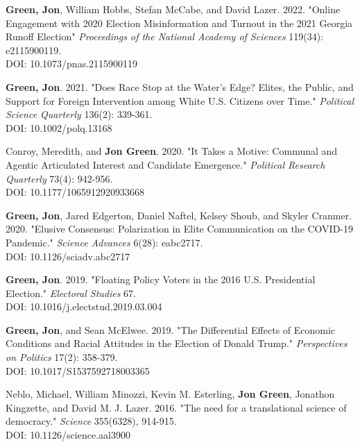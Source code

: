 \documentclass[letterpaper]{article}
\begin{document}
\begin{etaremune}
\item  \textbf{Green, Jon}, William Hobbs, Stefan McCabe, and David Lazer. 2022. "Online Engagement with 2020 Election Misinformation and Turnout in the 2021 Georgia Runoff Election"  \textit{Proceedings of the National Academy of Sciences} 119(34): e2115900119. \\
DOI: 10.1073/pnas.2115900119

\item \textbf{Green, Jon}. 2021. "Does Race Stop at the Water's Edge? Elites, the Public, and Support for Foreign Intervention among White U.S. Citizens over Time." \textit{Political Science Quarterly} 136(2): 339-361. \\
DOI: 10.1002/polq.13168

\item Conroy, Meredith, and \textbf{Jon Green}. 2020. "It Takes a Motive: Communal and Agentic Articulated Interest and Candidate Emergence."  \textit{Political Research Quarterly} 73(4): 942-956. \\
DOI: 10.1177/1065912920933668

\item \textbf{Green, Jon}, Jared Edgerton, Daniel Naftel, Kelsey Shoub, and Skyler Cranmer. 2020. "Elusive Consensus: Polarization in Elite Communication on the COVID-19 Pandemic." \textit{Science Advances} 6(28): eabc2717. \\
DOI: 10.1126/sciadv.abc2717

\item \textbf{Green, Jon}. 2019. "Floating Policy Voters in the 2016 U.S. Presidential Election." \textit{Electoral Studies} 67. \\
DOI: 10.1016/j.electstud.2019.03.004

\item \textbf{Green, Jon}, and Sean McElwee. 2019. "The Differential Effects of Economic Conditions and Racial Attitudes in the Election of Donald Trump." \textit{Perspectives on Politics} 17(2): 358-379. \\
DOI: 10.1017/S1537592718003365

\item Neblo, Michael, William Minozzi, Kevin M. Esterling, \textbf{Jon Green}, Jonathon Kingzette, and David M. J. Lazer. 2016. "The need for a translational science of democracy." \textit{Science} 355(6328), 914-915.\\
DOI: 10.1126/science.aal3900

\end{etaremune}
\end{document}
